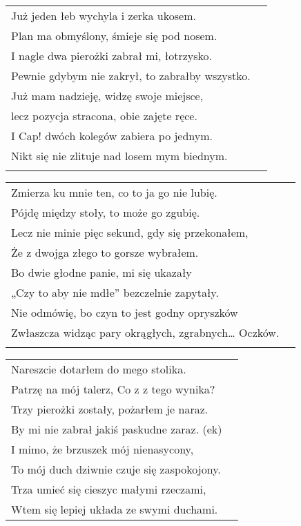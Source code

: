 \documentclass[a5paper]{article}
\begin{document}
\noindent
\begin{tabular}{@{}p{9.50cm}p{3cm}@{}}
Już jeden łeb wychyla i zerka ukosem.\\
Plan ma obmyślony, śmieje się pod nosem.\\
I nagle dwa pierożki zabrał mi, łotrzysko.\\
Pewnie gdybym nie zakrył, to zabrałby wszystko.\\
Już mam nadzieję, widzę swoje miejsce,\\
lecz pozycja stracona, obie zajęte ręce.\\
I Cap! dwóch kolegów zabiera po jednym.\\
Nikt się nie zlituje nad losem mym biednym.\\\\
\end{tabular}

\noindent
\begin{tabular}{@{}p{9.50cm}p{3cm}@{}}
Zmierza ku mnie ten, co to ja go nie lubię.\\
Pójdę między stoły, to może go zgubię.\\
Lecz nie minie pięc sekund, gdy się przekonałem,\\
Że z dwojga złego to gorsze wybrałem.\\
Bo dwie głodne panie, mi się ukazały\\
„Czy to aby nie mdłe” bezczelnie zapytały.\\
Nie odmówię, bo czyn to jest godny opryszków\\
Zwłaszcza widząc pary okrągłych, zgrabnych… Oczków.\\ \\
\end{tabular}

\noindent
\begin{tabular}{@{}p{9.50cm}p{3cm}@{}}
Nareszcie dotarłem do mego stolika.\\
Patrzę na mój talerz, Co z z tego wynika?\\
Trzy pierożki zostały, pożarłem je naraz.\\
By mi nie zabrał jakiś paskudne zaraz. (ek)\\
I mimo, że brzuszek mój nienasycony,\\
To mój duch dziwnie czuje się zaspokojony.\\
Trza umieć się cieszyc małymi rzeczami,\\
Wtem się lepiej układa ze swymi duchami.\\
\end{tabular}
\end{document}
